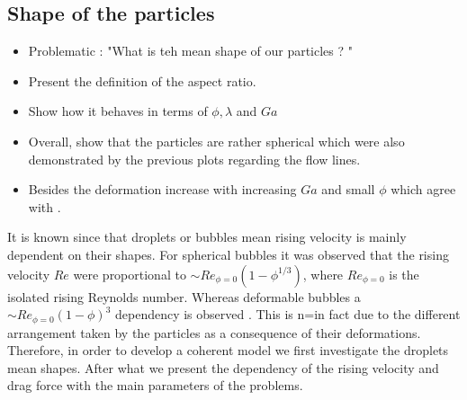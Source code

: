 
\subsection{Shape of the particles}
\begin{itemize}
    \item Problematic : "What is teh mean shape of our particles ? "
    \item Present the definition of the aspect ratio.
    \item Show how it behaves in terms of $\phi,\lambda$ and $Ga$
    \item Overall, show that the particles are rather spherical which were also demonstrated by the previous plots regarding the flow lines. 
    \item Besides the deformation increase with increasing $Ga$ and small $\phi$ which agree with \citet{loisy2017buoyancy}. 
\end{itemize}


It is known since  \citet{bunner2003effect} that droplets or bubbles mean rising velocity is mainly dependent on their shapes. 
For spherical bubbles it was observed that the rising velocity $Re$ were proportional to $\sim Re_{\phi=0}(1 - \phi^{1/3})$, where $Re_{\phi=0}$ is the isolated rising Reynolds number. 
Whereas deformable bubbles a $\sim Re_{\phi=0}(1 - \phi)^{3}$ dependency is observed . 
This is n=in fact due to the different arrangement taken by the particles as a consequence of their deformations. 
Therefore, in order to develop a coherent model we first investigate the droplets mean shapes. 
After what we present the dependency of the rising velocity and drag force with the main parameters of the problems.  

